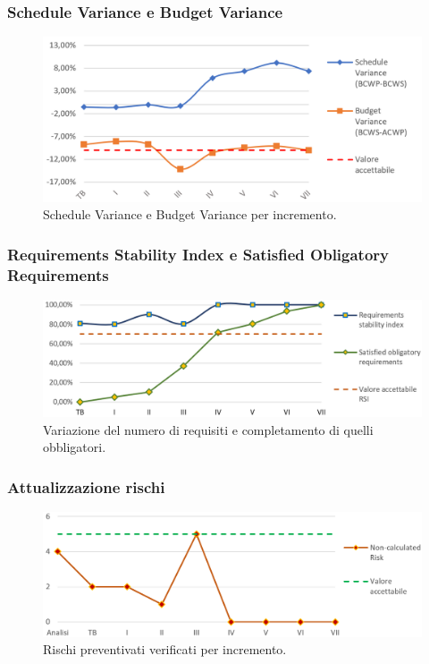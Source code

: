 \newpage

\subsubsection{Schedule Variance e Budget Variance}
\begin{figure}[h]
	\centering
	\includegraphics[width=16cm]{Images/SV-BV}
	\caption{Schedule Variance e Budget Variance per incremento.}
\end{figure}



\subsubsection{Requirements Stability Index e Satisﬁed Obligatory Requirements}
\begin{figure}[h]
	\centering
	\includegraphics[width=16cm]{Images/requisiti}
	\caption{Variazione del numero di requisiti e completamento di quelli obbligatori.}
\end{figure}

\newpage

\subsubsection{Attualizzazione rischi}
\begin{figure}[h]
	\centering
	\includegraphics[width=17cm]{Images/rischi}
	\caption{Rischi preventivati verificati per incremento.}
\end{figure}



